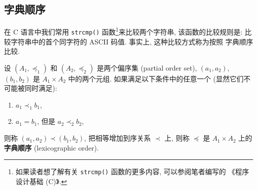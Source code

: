 \documentclass[10pt,UTF8]{book} %
\begin{document}
\subsection{字典顺序}

在 C 语言中我们常用 \lstinline|strcmp()| 函数\footnote{
    如果读者想了解有关 \lstinline|strcmp()| 函数的更多内容, 可以参阅笔者编写的
    《程序设计基础 (C)》.
}来比较两个字符串,
该函数的比较规则是: 比较字符串中的首个同字符的 ASCII 码值. 事实上, 这种比较方式称为按照
字典顺序比较.

\begin{definition}[字典顺序]
    设 $(A_1, \preccurlyeq_1)$ 和 $(A_2, \preccurlyeq_2)$ 是两个偏序集 (partial order set),
    $(a_1, a_2)$, $(b_1, b_2)$ 是 $A_1 \times A_2$ 中的两个元组.
    如果满足以下条件中的任意一个 (显然它们不可能被同时满足):
    \begin{enumerate}[label={${\arabic*}^\circ$}, itemsep=0pt]
        \item $a_1 \prec_1 b_1$,
        \item $a_1 = b_1$, 但是 $a_2 \prec_2 b_2$,
    \end{enumerate}
    则称 $(a_1, a_2) \prec (b_1, b_2)$, 把相等增加到序关系 $\prec$ 上, 则称
    $\preccurlyeq$ 是 $A_1 \times A_2$ 上的\textbf{字典顺序} (lexicographic order).
\end{definition}

        
\end{document}
